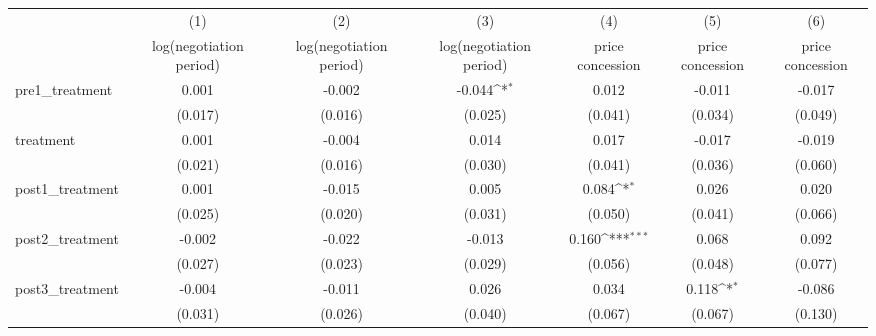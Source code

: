 {
\def\sym#1{\ifmmode^{#1}\else\(^{#1}\)\fi}
\begin{adjustbox}{max width=\textwidth}
\begin{tabular}{l*{6}{c}}
\toprule
            &\multicolumn{1}{c}{(1)}&\multicolumn{1}{c}{(2)}&\multicolumn{1}{c}{(3)}&\multicolumn{1}{c}{(4)}&\multicolumn{1}{c}{(5)}&\multicolumn{1}{c}{(6)}\\
            &\multicolumn{1}{c}{log(negotiation period)}&\multicolumn{1}{c}{log(negotiation period)}&\multicolumn{1}{c}{log(negotiation period)}&\multicolumn{1}{c}{price concession}&\multicolumn{1}{c}{price concession}&\multicolumn{1}{c}{price concession}\\
\midrule
pre1\_treatment&       0.001         &      -0.002         &      -0.044\sym{*}  &       0.012         &      -0.011         &      -0.017         \\
            &     (0.017)         &     (0.016)         &     (0.025)         &     (0.041)         &     (0.034)         &     (0.049)         \\
\addlinespace
treatment   &       0.001         &      -0.004         &       0.014         &       0.017         &      -0.017         &      -0.019         \\
            &     (0.021)         &     (0.016)         &     (0.030)         &     (0.041)         &     (0.036)         &     (0.060)         \\
\addlinespace
post1\_treatment&       0.001         &      -0.015         &       0.005         &       0.084\sym{*}  &       0.026         &       0.020         \\
            &     (0.025)         &     (0.020)         &     (0.031)         &     (0.050)         &     (0.041)         &     (0.066)         \\
\addlinespace
post2\_treatment&      -0.002         &      -0.022         &      -0.013         &       0.160\sym{***}&       0.068         &       0.092         \\
            &     (0.027)         &     (0.023)         &     (0.029)         &     (0.056)         &     (0.048)         &     (0.077)         \\
\addlinespace
post3\_treatment&      -0.004         &      -0.011         &       0.026         &       0.034         &       0.118\sym{*}  &      -0.086         \\
            &     (0.031)         &     (0.026)         &     (0.040)         &     (0.067)         &     (0.067)         &     (0.130)         \\

\end{tabular}
\end{adjustbox}}
